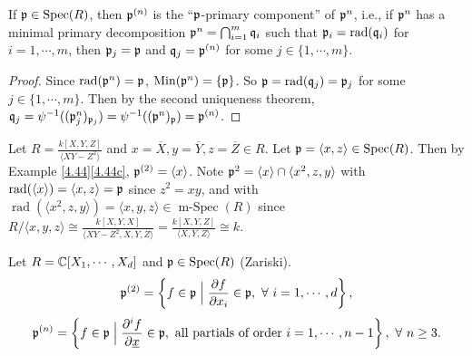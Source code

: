 \begin{proposition}\label{4.45}
    If $\mathfrak{p} \in \operatorname{Spec}(R)$, then $\mathfrak{p}^{(n)}$ is the ``$\mathfrak{p}$-primary component'' of $\mathfrak{p}^{n}$, i.e., if $\mathfrak{p}^{n}$ has a minimal primary decomposition $\mathfrak{p}^{n} = \bigcap_{i=1}^{m} \mathfrak{q}_i$ such that $\mathfrak{p}_i = \operatorname{rad}(\mathfrak{q}_i)$ for $i = 1,\cdots,m$, then $\mathfrak{p}_j = \mathfrak{p}$ and $\mathfrak{q}_j = \mathfrak{p}^{(n)}$ for some $j \in \{1,\cdots,m\}$. 
\end{proposition}

\begin{proof}
    Since $\operatorname{rad}(\mathfrak{p}^{n}) = \mathfrak{p}$, $\operatorname{Min}(\mathfrak{p}^{n}) = \{\mathfrak{p}\}$. So $\mathfrak{p} = \operatorname{rad}(\mathfrak{q}_j) = \mathfrak{p}_j$ for some $j \in \{1,\cdots,m\}$. Then by the second uniqueness theorem, $\mathfrak{q}_j = \psi^{-1}((\mathfrak{p}_j^{n})_{\mathfrak{p}_j}) = \psi^{-1}((\mathfrak{p}^{n})_{\mathfrak{p}}) = \mathfrak{p}^{(n)}$.
\end{proof}

\begin{example}\label{4.46}
    Let $R = \frac{k[X,Y,Z]}{\langle XY-Z^{2} \rangle}$ and $x = \overbar{X}, y = \overbar{Y}, z = \overbar{Z} \in R$. Let $\mathfrak{p} = \langle x,z \rangle \in \operatorname{Spec}(R)$. Then by Example \ref{4.44}\ref{4.44c}, $\mathfrak{p}^{(2)} = \langle x \rangle$. Note $\mathfrak{p}^{2} = \langle x \rangle \cap \langle x^{2},z,y \rangle$ with $\operatorname{rad}(\langle x \rangle) = \langle x,z \rangle = \mathfrak{p}$ since $z^{2} = xy$, and with $\operatorname{rad}(\langle x^{2},z,y \rangle) = \langle x,y,z \rangle \in \operatorname{m-Spec}(R)$ since $R/\langle x,y,z \rangle \cong \frac{k[X,Y,X]}{\langle XY-Z^{2},X,Y,Z \rangle} = \frac{k[X,Y,Z]}{\langle X,Y,Z \rangle} \cong k$.
\end{example}

\begin{definition}\label{4.47}
    Let $R = \mathbb{C}[X_1,\cdots,X_d]$ and $\mathfrak{p} \in \operatorname{Spec}(R)$ (Zariski). 
    \[\mathfrak{p}^{(2)} = \left\{f \in \mathfrak{p} \mathrel{\Big |} \frac{\partial f}{ \partial x_i} \in \mathfrak{p},\ \forall \  i = 1,\cdots,d\right\},\] 
    \[\mathfrak{p}^{(n)} = \left\{f \in \mathfrak{p} \mathrel{\Big |} \frac{\partial^{i} f}{\partial \underline x} \in \mathfrak{p}, \text{ all partials of order } i = 1,\cdots,n-1\right\},\ \forall \  n \geq 3.\]
\end{definition}
